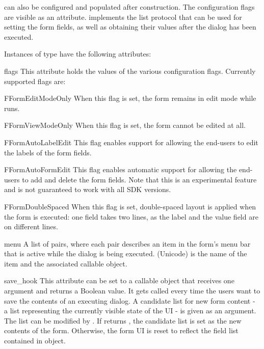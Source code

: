  can also be configured and populated after construction. The 
configuration flags are visible as an attribute.  implements 
the list protocol that can be used for setting the form fields, as well as 
obtaining their values after the dialog has been executed.

Instances of  type have the following attributes:

\begin{memberdesc}[Form]{flags}
This attribute holds the values of the various configuration flags. 
Currently supported flags are:

\begin{datadesc}{FFormEditModeOnly}
When this flag is set, the form remains in edit mode while  
runs.
\end{datadesc}

\begin{datadesc}{FFormViewModeOnly}
When this flag is set, the form cannot be edited at all.
\end{datadesc}

\begin{datadesc}{FFormAutoLabelEdit}
This flag enables support for allowing the end-users to edit the labels of 
the form fields.
\end{datadesc}

\begin{datadesc}{FFormAutoFormEdit}
This flag enables automatic support for allowing the end-users to add and 
delete the form fields. Note that this is an experimental feature and is not 
guaranteed to work with all SDK versions.
\end{datadesc}

\begin{datadesc}{FFormDoubleSpaced}
When this flag is set, double-spaced layout is applied when the form is 
executed: one field takes two lines, as the label and the value field are on 
different lines.
\end{datadesc}
\end{memberdesc}

\begin{memberdesc}[Form]{menu}
A list of  pairs, where 
each pair describes an item in the form's menu bar that is active while the 
dialog is being executed.  (Unicode) is the name of 
the item and  the associated callable object.
\end{memberdesc}

\begin{memberdesc}[Form]{save_hook}
This attribute can be set to a callable object that receives one argument 
and returns a Boolean value. It gets called every time the users want to 
save the contents of an executing  dialog. A candidate list for 
new form content - a list representing the currently visible state of the 
UI - is given as an argument. The list can be modified by 
. If  returns , the 
candidate list is set as the new contents of the form. Otherwise, the form 
UI is reset to reflect the field list contained in  object.
\end{memberdesc}

